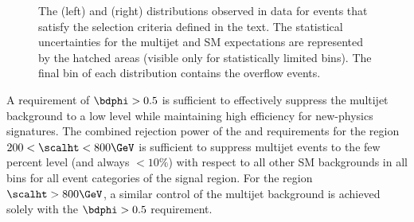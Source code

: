 \begin{figure}[!h]
{%
    The (left) \alphat and (right) \bdphi distributions observed in
    data for events that satisfy the selection criteria defined in the
    text. The statistical uncertainties for the multijet and SM
    expectations are represented by the hatched areas (visible only
    for statistically limited bins). The final bin of each
    distribution contains the overflow events.  }
  \label{fig:alphat-bdphi} 
\end{figure}

A requirement of $\bdphi > 0.5$ is sufficient to effectively suppress
the multijet background to a low level while maintaining high
efficiency for new-physics signatures. The combined rejection power of
the \alphat and \bdphi requirements for the region $200 < \scalht <
800\GeV$ is sufficient to suppress multijet events to the few percent
level (and always $<10\%$) with respect to all other SM backgrounds in
all \scalht bins for all event categories of the signal region. For
the region $\scalht > 800\GeV$, a similar control of the multijet
background is achieved solely with the $\bdphi > 0.5$ requirement.

